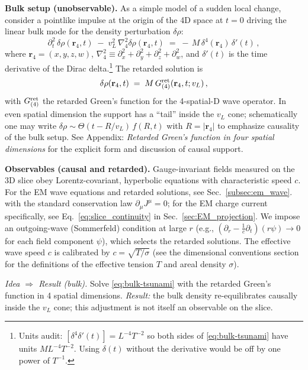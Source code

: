 \medskip
\noindent\textbf{Bulk setup (unobservable).} As a simple model of a sudden local change, consider a pointlike impulse at the origin of the 4D space at $t=0$ driving the linear bulk mode for the density perturbation $\delta\rho$:
\begin{equation}
\partial_t^2 \,\delta\rho(\mathbf r_4,t)\;-\; v_L^2 \,\nabla_4^2 \delta\rho(\mathbf r_4,t)
\;=\; -\,M\,\delta^4(\mathbf r_4)\,\delta'(t)\,,
\label{eq:bulk-tsunami}
\end{equation}
where $\mathbf r_4=(x,y,z,w)$, $\nabla_4^2\!\equiv\!\partial_x^2{+}\partial_y^2{+}\partial_z^2{+}\partial_w^2$, and $\delta'(t)$ is the time derivative of the Dirac delta.\footnote{Units audit: $[\delta^4\delta'(t)]=L^{-4}T^{-2}$ so both sides of \eqref{eq:bulk-tsunami} have units $ML^{-4}T^{-2}$. Using $\delta(t)$ without the derivative would be off by one power of $T^{-1}$.}
The retarded solution is
\begin{equation}
\delta\rho(\mathbf r_4,t)\;=\;M\,G^{\rm ret}_{(4)}(\mathbf r_4,t;v_L)\,,
\end{equation}
with $G^{\rm ret}_{(4)}$ the retarded Green's function for the 4-spatial-D wave operator. In even spatial dimension the support has a “tail” inside the $v_L$ cone; schematically one may write $\delta\rho \sim \Theta(t{-}R/v_L)\,f(R,t)$ with $R=|\mathbf r_4|$ to emphasize causality of the bulk setup. See Appendix: \emph{Retarded Green's function in four spatial dimensions} for the explicit form and discussion of causal support.

\medskip
\noindent\textbf{Observables (causal and retarded).} Gauge-invariant fields measured on the 3D slice obey Lorentz-covariant, hyperbolic equations with characteristic speed $c$. For the EM wave equations and retarded solutions, see Sec.~\ref{subsec:em_wave}.
with the standard conservation law $\partial_\mu J^\mu=0$; for the EM charge current specifically, see Eq.~\ref{eq:slice_continuity} in Sec.~\ref{sec:EM_projection}. We impose an outgoing-wave (Sommerfeld) condition at large $r$ (e.g., $(\partial_r-\tfrac1c\partial_t)(r\psi)\!\to\!0$ for each field component $\psi$), which selects the retarded solutions. The effective wave speed $c$ is calibrated by $c=\sqrt{T/\sigma}$ (see the dimensional conventions section for the definitions of the effective tension $T$ and areal density $\sigma$).

\medskip
\noindent\emph{Idea $\Rightarrow$ Result (bulk).} Solve \eqref{eq:bulk-tsunami} with the retarded Green's function in 4 spatial dimensions. \emph{Result:} the bulk density re-equilibrates causally inside the $v_L$ cone; this adjustment is not itself an observable on the slice.

